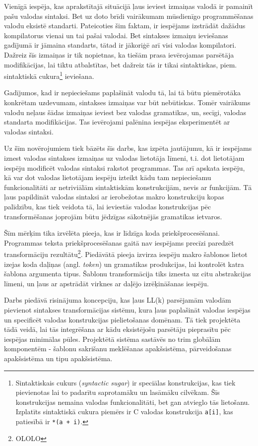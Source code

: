 Vienīgā iespēja, kas aprakstītajā situācijā ļaus ieviest izmaiņas valodā ir pamainīt pašu valodas sintaksi. Bet uz doto brīdi vairākumam mūsdienīgo programmēšanas valodu eksistē standarti. Pateicoties šim faktam, ir iespējams izstrādāt dažādus kompilatorus vienai un tai pašai valodai. Bet sintakses izmaiņu ieviešanas gadījumā ir jāmaina standarts, tātad ir jākoriģē arī visi valodas kompilatori. Dažreiz šīs izmaiņas ir tik nopietnas, ka tiešām prasa ievērojamas parsētāja modifikācijas, lai tiktu atbalstītas, bet dažreiz tās ir tikai sintaktiskas, piem. sintaktiskā cukura\footnote{Sintaktiskais cukurs (\emph{syntactic sugar}) ir speciālas konstrukcijas, kas tiek pievienotas lai to padarītu saprotamāku un lasāmāku cilvēkam. Šīs konstrukcijas nemaina valodas funkcionalitāti, bet gan atvieglo tās lietošanu. Izplatīts sintaktiskā cukura piemērs ir C valodas konstrukcija \texttt{a[i]}, kas patiesībā ir \texttt{*(a + i)}.} ieviešana.

Gadījumos, kad ir nepieciešams paplašināt valodu tā, lai tā būtu piemērotāka konkrētam uzdevumam, sintakses izmaiņas var būt nebūtiskas. Tomēr vairākums valodu neļaus šādas izmaiņas ieviest bez valodas gramatikas, un, secīgi, valodas standarta modifikācijas. Tas ievērojami palēnina iespējas eksperimentēt ar valodas sintaksi.

Uz šīm novērojumiem tiek bāzēts šīs darbs, kas izpēta jautājumu, kā ir iespējams iznest valodas sintakses izmaiņas uz valodas lietotāja līmeni, t.i. dot lietotājam iespēju modificēt valodas sintaksi rakstot programmas. Tas arī apskata iespēju, kā var dot valodas lietotājam iespēju izteikt kādu tam nepieciešamu funkcionalitāti ar netriviālām sintaktiskām konstrukcijām, nevis ar funkcijām. Tā ļaus papildināt valodas sintaksi ar ierobežotas makro konstrukciju kopas palīdzību, kas tiek veidota tā, lai ieviestās valodas konstrukcijas pēc transformēšanas joprojām būtu jēdzīgas sākotnējās gramatikas ietvaros.

Šīm mērķim tika izvēlēta pieeja, kas ir līdzīga koda priekšprocesēšanai. Programmas teksta priekšprocesēšanas gaitā nav iespējams precīzi paredzēt transformāciju rezultātu\footnote{OLOLO}. Piedāvātā pieeja izvirza iespēju makro šablonos lietot izejas koda daļiņas (angl. \emph{token}) un gramatikas produkcijas, lai kontrolēt katra šablona argumenta tipus. Šablonu transformācija tiks iznesta uz citu abstrakcijas līmeni, un ļaus ar apstrādāt virknes ar daļējo izrēķināšanas iespēju.

Darbs piedāvā risinājuma koncepciju, kas ļaus LL(k) parsējamām valodām pievienot sintakses transformācijas sistēmu, kura ļaus paplašināt valodas iespējas un specificēt valodas konstrukcijas pielietošanas domēnam. Tā tiek projektēta tādā veidā, lai tās integrēšana ar kādu eksistējošu parsētāju pieprasītu pēc iespējas minimālas pūles. Projektētā sistēma sastāvēs no trim globālām komponentēm - šablonu sakrišanu meklēšanas apakšsistēma, pārveidošanas apakšsistēma un tipu apakšsistēma. %

